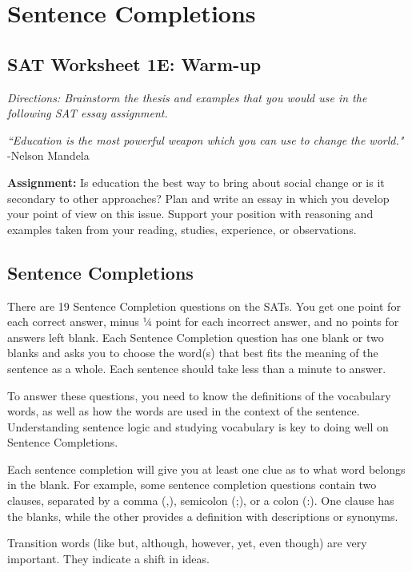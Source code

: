 \documentclass[12pt]{book}
\begin{document}
\chapter{Sentence Completions}
\section{SAT Worksheet 1E: Warm-up}   %
\textit{Directions: Brainstorm the thesis and examples that you would use in the following SAT essay assignment.}

\textit{``Education is the most powerful weapon which you can use to change the world."}
-Nelson Mandela

\bigskip
\textbf{Assignment:} Is education the best way to bring about social change or is it secondary to other approaches?  Plan and write an essay in which you develop your point of view on this issue.  Support your position with reasoning and examples taken from your reading, studies, experience, or observations.

\vfill
\newpage

\section{Sentence Completions}
There are 19 Sentence Completion questions on the SATs.  You get one point for each correct answer, minus ¼ point for each incorrect answer, and no points for answers left blank. Each Sentence Completion question has one blank or two blanks and asks you to choose the word(s) that best fits the meaning of the sentence as a whole.  Each sentence should take less than a minute to answer.

\bigskip
To answer these questions, you need to know the definitions of the vocabulary words, as well as how the words are used in the context of the sentence.  Understanding sentence logic and studying vocabulary is key to doing well on Sentence Completions.  

\bigskip
Each sentence completion will give you at least one clue as to what word belongs in the blank. For example, some sentence completion questions contain two clauses, separated by a comma (,), semicolon (;), or a colon (:).  One clause has the blanks, while the other provides a definition with descriptions or synonyms.

\bigskip
Transition words (like but, although, however, yet, even though) are very important.  They indicate a shift in ideas.  
\end{document}
